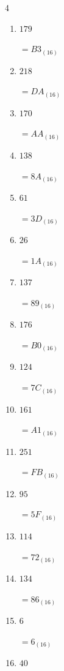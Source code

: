 \begin{multicols}{4}
\begin{enumerate}
        $=2A_{(16)}$

  \item $179$

        $=B3_{(16)}$

  \item $218$

        $=DA_{(16)}$

  \item $170$

        $=AA_{(16)}$

  \item $138$

        $=8A_{(16)}$

  \item $61$

        $=3D_{(16)}$

  \item $26$

        $=1A_{(16)}$

\columnbreak %

\resetques

  \item $137$

        $=89_{(16)}$

  \item $176$

        $=B0_{(16)}$

  \item $124$

        $=7C_{(16)}$

  \item $161$

        $=A1_{(16)}$

  \item $251$

        $=FB_{(16)}$

  \item $95$

        $=5F_{(16)}$

  \item $114$

        $=72_{(16)}$

  \item $134$

        $=86_{(16)}$

  \item $6$

        $=6_{(16)}$

  \item $40$


\end{enumerate}
\end{multicols}
